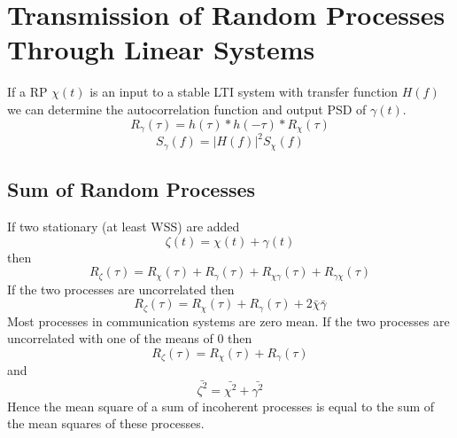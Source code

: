 \documentclass{article}
\begin{document}
    \section{Transmission of Random Processes Through Linear Systems}
    If a RP $\chi(t)$ is an input to a stable LTI system with transfer function $H(f)$ we can determine the autocorrelation
    function and output PSD of $\gamma(t)$.  
    \begin{equation}
        R_\gamma(\tau) = h(\tau) \ast h(-\tau) \ast R_\chi(\tau)
    \end{equation}
    \begin{equation}
        S_\gamma(f) = |H(f)|^2S_\chi(f)
    \end{equation}

    \subsection{Sum of Random Processes}
    If two stationary (at least WSS) are added 
    \begin{equation}
        \zeta(t) = \chi(t) + \gamma(t)
    \end{equation}
    then 
    \begin{equation}
        R_\zeta(\tau) = R_\chi(\tau) + R_\gamma(\tau) + R_{\chi\gamma}(\tau) + R_{\gamma\chi}(\tau)
    \end{equation}
    If the two processes are uncorrelated then
    \begin{equation}
        R_\zeta(\tau) = R_\chi(\tau) + R_\gamma(\tau) + 2\bar{\chi}\bar{\gamma}
    \end{equation}
    Most processes in communication systems are zero mean. If the two processes are uncorrelated with one of the means of $0$
    then
    \begin{equation}
        R_\zeta(\tau) = R_\chi(\tau) + R_\gamma(\tau)
    \end{equation}
    and 
    \begin{equation}
        \bar{\zeta^2} = \bar{\chi^2} + \bar{\gamma^2}
    \end{equation}
    Hence the mean square of a sum of incoherent processes is equal to the sum of the mean squares of these processes.
\end{document}
